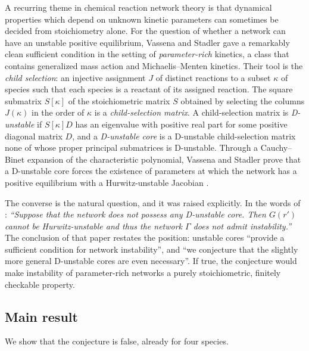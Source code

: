 \documentclass[11pt,a4paper]{article}
\theoremstyle{definition}
\theoremstyle{remark}
\begin{document}
A recurring theme in chemical reaction network theory is that dynamical properties which depend on unknown kinetic parameters can sometimes be decided from stoichiometry alone. For the question of whether a network can have an unstable positive equilibrium, Vassena and Stadler \cite{VassenaStadler2024} gave a remarkably clean sufficient condition in the setting of \emph{parameter-rich} kinetics, a class that contains generalized mass action \cite{MullerRegensburger2012} and Michaelis--Menten kinetics. Their tool is the \emph{child selection}: an injective assignment $J$ of distinct reactions to a subset $\kappa$ of species such that each species is a reactant of its assigned reaction. The square submatrix $S[\kappa]$ of the stoichiometric matrix $S$ obtained by selecting the columns $J(\kappa)$ in the order of $\kappa$ is a \emph{child-selection matrix}. A child-selection matrix is \emph{D-unstable} if $S[\kappa]D$ has an eigenvalue with positive real part for some positive diagonal matrix $D$, and a \emph{D-unstable core} is a D-unstable child-selection matrix none of whose proper principal submatrices is D-unstable. Through a Cauchy--Binet expansion of the characteristic polynomial, Vassena and Stadler prove that a D-unstable core forces the existence of parameters at which the network has a positive equilibrium with a Hurwitz-unstable Jacobian \cite[Cor.~12, Cor.~13]{VassenaStadler2024}.

The converse is the natural question, and it was raised explicitly. In the words of \cite[Conj.~17]{VassenaStadler2024}: \emph{``Suppose that the network does not possess any D-unstable core. Then $G(r')$ cannot be Hurwitz-unstable and thus the network $\Gamma$ does not admit instability.''} The conclusion of that paper restates the position: unstable cores ``provide a sufficient condition for network instability'', and ``we conjecture that the slightly more general D-unstable cores are even necessary''. If true, the conjecture would make instability of parameter-rich networks a purely stoichiometric, finitely checkable property.

\subsection*{Main result}

We show that the conjecture is false, already for four species.
\end{document}
